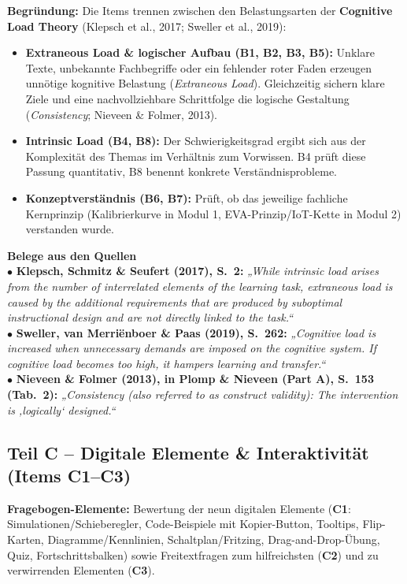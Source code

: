 \documentclass[a4paper,10pt]{article}
\newcommand{\quotebox}[2]{%
  \begin{tcolorbox}[
    colback=lightgray,
    colframe=accent,
    arc=1.5mm,
    boxrule=0pt,
    leftrule=3pt,
    top=5pt, bottom=5pt, left=8pt, right=8pt
  ]
  {\small \textbf{\color{primary} #1}\\[2pt]
  #2}
  \end{tcolorbox}
}
\begin{document}
\textbf{Begründung:} Die Items trennen zwischen den Belastungsarten der \textbf{Cognitive Load Theory} (Klepsch et al., 2017; Sweller et al., 2019):
\begin{itemize}[leftmargin=1.5em, itemsep=1pt, topsep=1pt]
  \item \textbf{Extraneous Load \& logischer Aufbau (B1, B2, B3, B5):} Unklare Texte, unbekannte Fachbegriffe oder ein fehlender roter Faden erzeugen unnötige kognitive Belastung (\textit{Extraneous Load}). Gleichzeitig sichern klare Ziele und eine nachvollziehbare Schrittfolge die logische Gestaltung (\textit{Consistency}; Nieveen \& Folmer, 2013).
  \item \textbf{Intrinsic Load (B4, B8):} Der Schwierigkeitsgrad ergibt sich aus der Komplexität des Themas im Verhältnis zum Vorwissen. B4 prüft diese Passung quantitativ, B8 benennt konkrete Verständnisprobleme.
  \item \textbf{Konzeptverständnis (B6, B7):} Prüft, ob das jeweilige fachliche Kernprinzip (Kalibrierkurve in Modul 1, EVA-Prinzip/IoT-Kette in Modul 2) verstanden wurde.
\end{itemize}

\quotebox{Belege aus den Quellen}{
$\bullet$ \textbf{Klepsch, Schmitz \& Seufert (2017), S.~2:} \textit{„While intrinsic load arises from the number of interrelated elements of the learning task, extraneous load is caused by the additional requirements that are produced by suboptimal instructional design and are not directly linked to the task.“}\\[3pt]
$\bullet$ \textbf{Sweller, van Merriënboer \& Paas (2019), S.~262:} \textit{„Cognitive load is increased when unnecessary demands are imposed on the cognitive system. If cognitive load becomes too high, it hampers learning and transfer.“}\\[3pt]
$\bullet$ \textbf{Nieveen \& Folmer (2013), in Plomp \& Nieveen (Part A), S.~153 (Tab.~2):} \textit{„Consistency (also referred to as construct validity): The intervention is ‚logically‘ designed.“}
}

\subsection*{\color{primary} Teil C – Digitale Elemente \& Interaktivität (Items C1–C3)}
\textbf{Fragebogen-Elemente:} Bewertung der neun digitalen Elemente (\textbf{C1}: Simulationen/Schieberegler, Code-Beispiele mit Kopier-Button, Tooltips, Flip-Karten, Diagramme/Kennlinien, Schaltplan/Fritzing, Drag-and-Drop-Übung, Quiz, Fortschrittsbalken) sowie Freitextfragen zum hilfreichsten (\textbf{C2}) und zu verwirrenden Elementen (\textbf{C3}).
\end{document}

